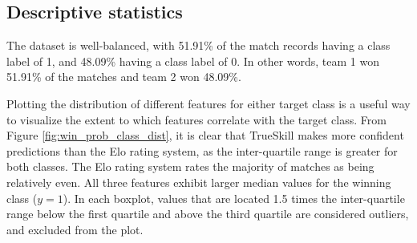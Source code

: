 %
%
%
%



\subsection{Descriptive statistics}

The dataset is well-balanced, with 51.91\% of the match records having a class label of 1, and 48.09\% having a class label of 0. In other words, team 1 won 51.91\% of the matches and team 2 won 48.09\%. 

Plotting the distribution of different features for either target class is a useful way to visualize the extent to which features correlate with the target class. From Figure \ref{fig:win_prob_class_dist}, it is clear that TrueSkill makes more confident predictions than the Elo rating system, as the inter-quartile range is greater for both classes. The Elo rating system rates the majority of matches as being relatively even. All three features exhibit larger median values for the winning class ($y=1$). In each boxplot, values that are located 1.5 times the inter-quartile range below the first quartile and above the third quartile are considered outliers, and excluded from the plot.

